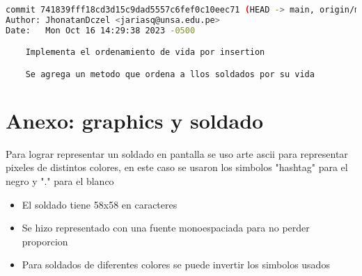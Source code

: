       \begin{lstlisting}[language=bash, caption={Commits principales}]
commit 741839fff18cd3d15c9dad5557c6fef0c10eec71 (HEAD -> main, origin/main)
Author: JhonatanDczel <jariasq@unsa.edu.pe>
Date:   Mon Oct 16 14:29:38 2023 -0500

    Implementa el ordenamiento de vida por insertion

    Se agrega un metodo que ordena a llos soldados por su vida
\end{lstlisting}
\section{Anexo: graphics y soldado}
Para lograr representar un soldado en pantalla se uso arte ascii para representar pixeles de distintos colores, en este caso se usaron los simbolos "hashtag" para el negro y "." para el blanco
\begin{itemize}
    \item El soldado tiene 58x58 en caracteres
    \item Se hizo representado con una fuente monoespaciada para no perder proporcion
    \item Para soldados de diferentes colores se puede invertir los simbolos usados
\end{itemize}
\newpage
